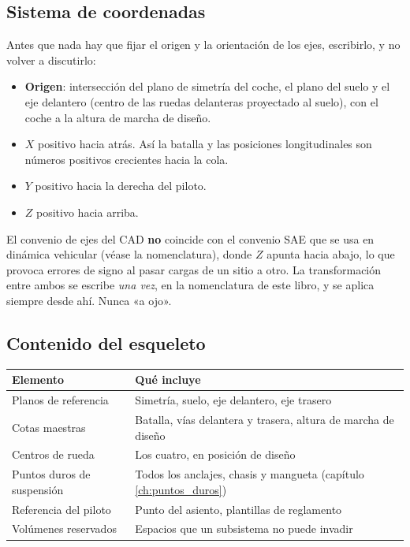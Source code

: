 \subsection{Sistema de coordenadas}

Antes que nada hay que fijar el origen y la orientación de los ejes, escribirlo,
y no volver a discutirlo:

\begin{itemize}
  \item \textbf{Origen}: intersección del plano de simetría del coche, el plano
        del suelo y el eje delantero (centro de las ruedas delanteras proyectado
        al suelo), con el coche a la altura de marcha de diseño.
  \item \textbf{$X$} positivo hacia atrás. Así la batalla y las posiciones
        longitudinales son números positivos crecientes hacia la cola.
  \item \textbf{$Y$} positivo hacia la derecha del piloto.
  \item \textbf{$Z$} positivo hacia arriba.
\end{itemize}

\begin{ojo}
El convenio de ejes del CAD \textbf{no} coincide con el convenio SAE que se usa
en dinámica vehicular (véase la nomenclatura), donde $Z$ apunta hacia abajo, lo
que provoca errores de signo al pasar cargas de un sitio a otro.
La transformación entre ambos se escribe \emph{una vez}, en la nomenclatura de
este libro, y se aplica siempre desde ahí. Nunca «a ojo».
\end{ojo}

\subsection{Contenido del esqueleto}

\begin{center}
\begin{tabularx}{\textwidth}{@{}lX@{}}
\toprule
\textbf{Elemento} & \textbf{Qué incluye} \\
\midrule
Planos de referencia & Simetría, suelo, eje delantero, eje trasero \\
Cotas maestras & Batalla, vías delantera y trasera, altura de marcha de diseño \\
Centros de rueda & Los cuatro, en posición de diseño \\
Puntos duros de suspensión & Todos los anclajes, chasis y mangueta (capítulo \ref{ch:puntos_duros}) \\
Referencia del piloto & Punto del asiento, plantillas de reglamento \\
Volúmenes reservados & Espacios que un subsistema no puede invadir \\
\bottomrule
\end{tabularx}
\end{center}

